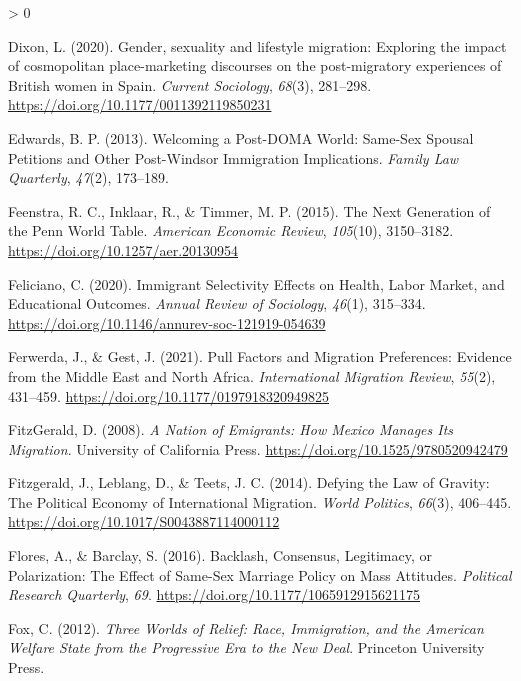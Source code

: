 \documentclass[
  11pt,
]{article}
\newlength{\cslhangindent}
\newenvironment{CSLReferences}[2] %
 {%
  \setlength{\parindent}{0pt}
  \ifodd #1 \everypar{\setlength{\hangindent}{\cslhangindent}}\ignorespaces\fi
  \ifnum #2 > 0
  \setlength{\parskip}{#2\baselineskip}
  \fi
 }%
 {}
\begin{document}
\begin{CSLReferences}{1}{0}
\leavevmode\hypertarget{ref-dixon_2020}{}%
Dixon, L. (2020). Gender, sexuality and lifestyle migration: {Exploring} the impact of cosmopolitan place-marketing discourses on the post-migratory experiences of {British} women in {Spain}. \emph{Current Sociology}, \emph{68}(3), 281--298. \url{https://doi.org/10.1177/0011392119850231}

\leavevmode\hypertarget{ref-edwards_2013}{}%
Edwards, B. P. (2013). Welcoming a {Post}-{DOMA World}: {Same}-{Sex Spousal Petitions} and {Other Post}-{Windsor Immigration Implications}. \emph{Family Law Quarterly}, \emph{47}(2), 173--189.

\leavevmode\hypertarget{ref-feenstra_2015}{}%
Feenstra, R. C., Inklaar, R., \& Timmer, M. P. (2015). The {Next Generation} of the {Penn World Table}. \emph{American Economic Review}, \emph{105}(10), 3150--3182. \url{https://doi.org/10.1257/aer.20130954}

\leavevmode\hypertarget{ref-feliciano_2020}{}%
Feliciano, C. (2020). Immigrant {Selectivity Effects} on {Health}, {Labor Market}, and {Educational Outcomes}. \emph{Annual Review of Sociology}, \emph{46}(1), 315--334. \url{https://doi.org/10.1146/annurev-soc-121919-054639}

\leavevmode\hypertarget{ref-ferwerda_2021_pull}{}%
Ferwerda, J., \& Gest, J. (2021). Pull {Factors} and {Migration Preferences}: {Evidence} from the {Middle East} and {North Africa}. \emph{International Migration Review}, \emph{55}(2), 431--459. \url{https://doi.org/10.1177/0197918320949825}

\leavevmode\hypertarget{ref-fitzgerald_2008}{}%
FitzGerald, D. (2008). \emph{A {Nation} of {Emigrants}: {How Mexico Manages Its Migration}}. {University of California Press}. \url{https://doi.org/10.1525/9780520942479}

\leavevmode\hypertarget{ref-fitzgerald_2014}{}%
Fitzgerald, J., Leblang, D., \& Teets, J. C. (2014). Defying the {Law} of {Gravity}: {The Political Economy} of {International Migration}. \emph{World Politics}, \emph{66}(3), 406--445. \url{https://doi.org/10.1017/S0043887114000112}

\leavevmode\hypertarget{ref-flores_2016_backlash}{}%
Flores, A., \& Barclay, S. (2016). Backlash, {Consensus}, {Legitimacy}, or {Polarization}: {The Effect} of {Same}-{Sex Marriage Policy} on {Mass Attitudes}. \emph{Political Research Quarterly}, \emph{69}. \url{https://doi.org/10.1177/1065912915621175}

\leavevmode\hypertarget{ref-fox_2012}{}%
Fox, C. (2012). \emph{Three {Worlds} of {Relief}: {Race}, {Immigration}, and the {American Welfare State} from the {Progressive Era} to the {New Deal}}. {Princeton University Press}.


\end{CSLReferences}
\end{document}
